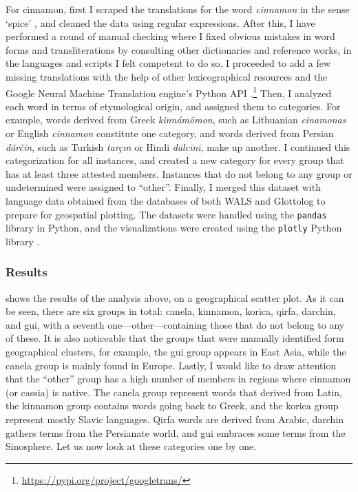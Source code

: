For cinnamon, first I scraped the translations for the word \textit{cinnamon} in the sense `spice' \autocite{wiktionary_cinnamon_nodate}, and cleaned the data using regular expressions. After this, I have performed a round of manual checking where I fixed obvious mistakes in word forms and transliterations by consulting other dictionaries and reference works, in the languages and scripts I felt competent to do so. I proceeded to add a few missing translations with the help of other lexicographical resources and the Google Neural Machine Translation engine's Python API \autocite{wu_googles_2016}.\footnote{\url{https://pypi.org/project/googletrans/}} Then, I analyzed each word in terms of etymological origin, and assigned them to categories. For example, words derived from Greek \textit{kinnámōmon}, such as Lithuanian \textit{cinamonas} or English \textit{cinnamon} constitute one category, and words derived from Persian \textit{dârčin}, such as Turkish \textit{tarçın} or Hindi \textit{dālcīnī}, make up another. I continued this categorization for all instances, and created a new category for every group that has at least three attested members. Instances that do not belong to any group or undetermined were assigned to ``other''. Finally, I merged this dataset with language data obtained from the databases of both \gls{WALS} \autocite{dryer_wals_2013} and Glottolog \autocite{hammarstrom_glottolog_2022} to prepare for geospatial plotting. The datasets were handled using the \texttt{pandas} library in Python, and the visualizations were created using the \texttt{plotly} Python library \autocites{pandas, plotly}.

\subsubsection{Results}

 shows the results of the analysis above, on a geographical scatter plot. As it can be seen, there are six groups in total: canela, kinnamon, korica, qirfa, darchin, and gui, with a seventh one---other---containing those that do not belong to any of these. It is also noticeable that the groups that were manually identified form geographical clusters, for example, the gui group appears in East Asia, while the canela group is mainly found in Europe. Lastly, I would like to draw attention that the ``other'' group has a high number of members in regions where cinnamon (or cassia) is native. The canela group represent words that derived from Latin, the kinnamon group contains words going back to Greek, and the korica group represent mostly Slavic languages. Qirfa words are derived from Arabic, darchin gathers terms from the Persianate world, and gui embraces some terms from the Sinosphere. Let us now look at these categories one by one.

